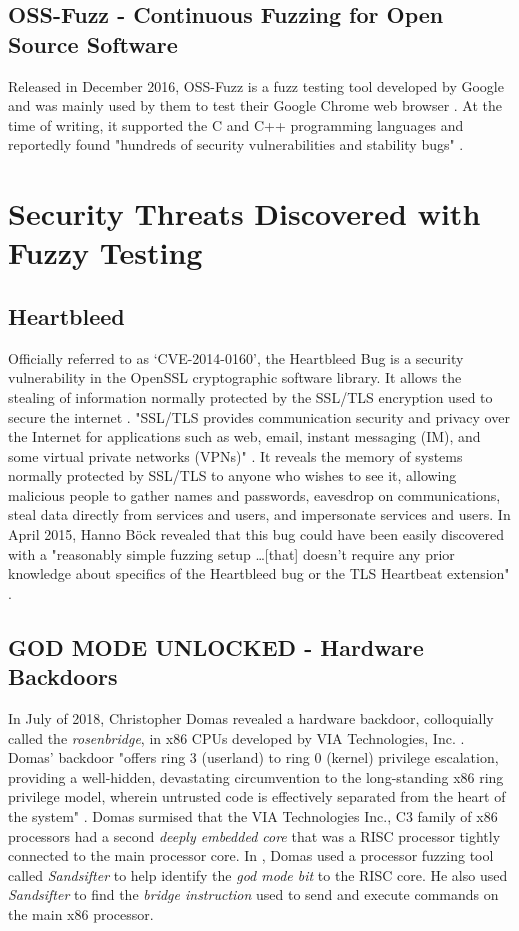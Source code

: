 \documentclass[10pt, final, journal, letterpaper, twoside, twocolumn]{IEEEtran}
\begin{document}
	\subsection{OSS-Fuzz - Continuous Fuzzing for Open Source Software}
		Released in December 2016, OSS-Fuzz is a fuzz testing tool developed by Google and was mainly used by them to test their Google Chrome web browser \cite{oss-fuzz}. At the time of writing, it supported the C and C++ programming languages and reportedly found "hundreds of security vulnerabilities and stability bugs" \cite{oss-fuzz}.
		

\section{\label{sec:bugs}Security Threats Discovered with Fuzzy Testing}
	\subsection{Heartbleed}
	Officially referred to as `CVE-2014-0160', the Heartbleed Bug is a security vulnerability in the OpenSSL cryptographic software library. It allows the stealing of information normally protected by the SSL/TLS encryption used to secure the internet \cite{heartbleed}. "SSL/TLS provides communication security and privacy over the Internet for applications such as web, email, instant messaging (IM), and some virtual private networks (VPNs)" \cite{heartbleed}. It reveals the memory of systems normally protected by SSL/TLS to anyone who wishes to see it, allowing malicious people to gather names and passwords, eavesdrop on communications, steal data directly from services and users, and impersonate services and users. In April 2015, Hanno B\"{o}ck revealed that this bug could have been easily discovered with a "reasonably simple fuzzing setup \dots [that] doesn't require any prior knowledge about specifics of the Heartbleed bug or the TLS Heartbeat extension" \cite{hanno}.
	
	\subsection{GOD MODE UNLOCKED - Hardware Backdoors}
		In July of 2018, Christopher Domas revealed a hardware backdoor, colloquially called the \textit{rosenbridge}, in x86 CPUs developed by VIA Technologies, Inc. \cite{GOD}. Domas' backdoor "offers ring 3 (userland) to ring 0 (kernel) privilege escalation, providing a well-hidden, devastating circumvention to the long-standing x86 ring privilege model, wherein untrusted code is effectively separated from the heart of the system" \cite{GOD}. Domas surmised that the VIA Technologies Inc., C3 family of x86 processors had a second \textit{deeply embedded core} that was a RISC processor tightly connected to the main processor core. In \cite{GOD}, Domas used a processor fuzzing tool called \textit{Sandsifter} to help identify the \textit{god mode bit} to the RISC core. He also used \textit{Sandsifter} to find the \textit{bridge instruction} used to send and execute commands on the main x86 processor.
	
\end{document}
